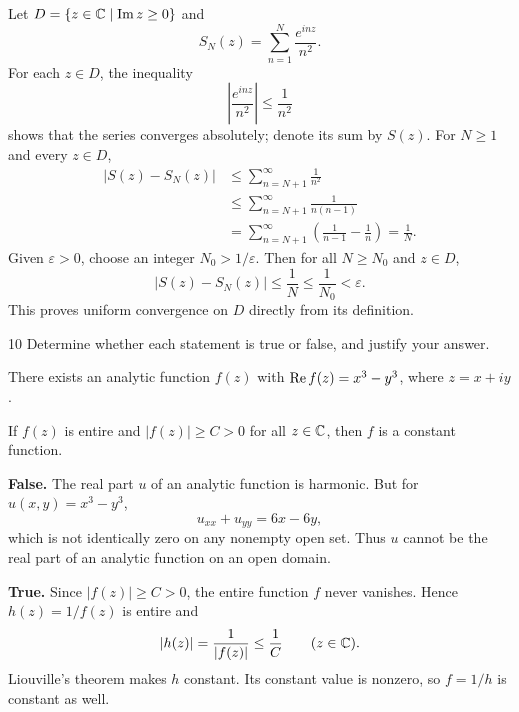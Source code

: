 \documentclass[11pt,oneside]{article}
\begin{document}
\begin{solution}[2]
Let $D=\{z\in\mathbb{C}\mid\operatorname{Im} z\ge0\}$ and
\[
    S_N(z)=\sum_{n=1}^{N}\frac{e^{inz}}{n^2}.
\]
For each $z\in D$, the inequality
\[
    \left|\frac{e^{inz}}{n^2}\right|\le\frac1{n^2}
\]
shows that the series converges absolutely; denote its sum by $S(z)$. For $N\ge1$ and every $z\in D$,
\[
\begin{aligned}
    |S(z)-S_N(z)|
    &\le\sum_{n=N+1}^{\infty}\frac1{n^2}\\
    &\le\sum_{n=N+1}^{\infty}\frac1{n(n-1)}\\
    &=\sum_{n=N+1}^{\infty}\left(\frac1{n-1}-\frac1n\right)
      =\frac1N.
\end{aligned}
\]
Given $\varepsilon>0$, choose an integer $N_0>1/\varepsilon$. Then for all $N\ge N_0$ and $z\in D$,
\[
    |S(z)-S_N(z)|\le\frac1N\le\frac1{N_0}<\varepsilon.
\]
This proves uniform convergence on $D$ directly from its definition.
\end{solution}

\begin{problem}{10}
Determine whether each statement is true or false, and justify your answer.
\begin{problemsubparts}
    \item There exists an analytic function $f(z)$ with
    $\operatorname{Re} f(z)=x^3-y^3$, where $z=x+iy$.
    \item If $f(z)$ is entire and $|f(z)|\ge C>0$ for all $z\in\mathbb{C}$,
    then $f$ is a constant function.
\end{problemsubparts}
\end{problem}

\begin{solution}
\begin{problemsubparts}
    \item \textbf{False.} The real part $u$ of an analytic function is harmonic. But for $u(x, y)=x^3-y^3$,
    \[
        u_{xx}+u_{yy}=6x-6y,
    \]
    which is not identically zero on any nonempty open set. Thus $u$ cannot be the real part of an analytic function on an open domain.

    \item \textbf{True.} Since $|f(z)|\ge C>0$, the entire function $f$ never vanishes. Hence $h(z)=1/f(z)$ is entire and
    \[
        |h(z)|=\frac1{|f(z)|}\le\frac1C
        \qquad(z\in\mathbb{C}).
    \]
    Liouville's theorem makes $h$ constant. Its constant value is nonzero, so $f=1/h$ is constant as well.
\end{problemsubparts}
\end{solution}
\end{document}
